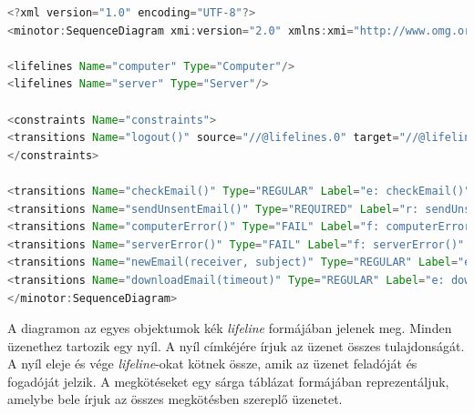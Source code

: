 \begin{lstlisting}[language=java, frame=single, float=ht!, caption={Szenárió diagram xml leírása.},captionpos=b]
<?xml version="1.0" encoding="UTF-8"?>
<minotor:SequenceDiagram xmi:version="2.0" xmlns:xmi="http://www.omg.org/XMI" xmlns:minotor="hu.bme.mit.mdsd.xboyz.erdiagram" Name="Email">

<lifelines Name="computer" Type="Computer"/>
<lifelines Name="server" Type="Server"/>

<constraints Name="constraints">
<transitions Name="logout()" source="//@lifelines.0" target="//@lifelines.1"/>
</constraints>

<transitions Name="checkEmail()" Type="REGULAR" Label="e: checkEmail()" source="//@lifelines.0" target="//@lifelines.0"  after="//@transitions.1" reset="x"/>
<transitions Name="sendUnsentEmail()" Type="REQUIRED" Label="r: sendUnsentEmail()" source="//@lifelines.0" target="//@lifelines.1" before="//@transitions.0" after="//@transitions.2"/>
<transitions Name="computerError()" Type="FAIL" Label="f: computerError()" source="//@lifelines.1" target="//@lifelines.0" before="//@transitions.1" after="//@transitions.3"/>
<transitions Name="serverError()" Type="FAIL" Label="f: serverError()" source="//@lifelines.0" target="//@lifelines.1" before="//@transitions.2" after="//@transitions.4"/>
<transitions Name="newEmail(receiver, subject)" Type="REGULAR" Label="e: newEmail(receiver, subject)" source="//@lifelines.0" target="//@lifelines.1" before="//@transitions.3" after="//@transitions.5" constraint="//@constraints.0" constraintType="PAST"/>
<transitions Name="downloadEmail(timeout)" Type="REGULAR" Label="e: downloadEmail(timeout)" source="//@lifelines.0" target="//@lifelines.1" before="//@transitions.4"   clockConstraint="x &gt; 10"/>
</minotor:SequenceDiagram>
\end{lstlisting}

A diagramon az egyes objektumok kék \textit{lifeline} formájában jelenek meg.
Minden üzenethez tartozik egy nyíl.
A nyíl címkéjére írjuk az üzenet összes tulajdonságát.
A nyíl eleje és vége \textit{lifeline}-okat kötnek össze, amik az üzenet feladóját és fogadóját jelzik.
A megkötéseket egy sárga táblázat formájában reprezentáljuk, amelybe bele írjuk az összes megkötésben szereplő üzenetet.

